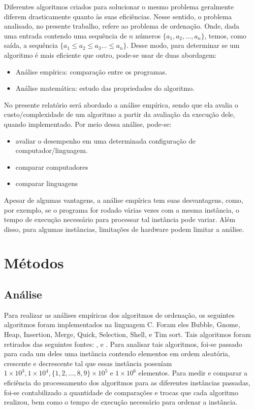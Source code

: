 \documentclass[report]{uftex}
\begin{document}
Diferentes algoritmos criados para solucionar o mesmo problema geralmente diferem drasticamente quanto às suas eficiências. Nesse sentido, o problema analisado, no presente trabalho, refere ao problema de ordenação. Onde, dada uma entrada contendo uma sequência de $n$ números $\{a_1,a_2,...,a_n\}$, temos, como saída, a sequência $\{a_1 \leq a_2 \leq a_3 ... \leq a_n\}$. Desse modo, para determinar se um algoritmo é mais eficiente que outro, pode-se usar de duas abordagem:
\begin{itemize}
    \item Análise empírica: comparação entre os programas.
    \item Análise matemática: estudo das propriedades do algoritmo.
\end{itemize}

No presente relatório será abordado a análise empírica, sendo que ela avalia o custo/complexidade de um algoritmo a partir da avaliação da execução dele, quando implementado. Por meio dessa análise, pode-se:
\begin{itemize}
    \item avaliar o desempenho em uma determinada configuração de computador/linguagem.
    \item comparar computadores
    \item comparar linguagens
\end{itemize}

Apesar de algumas vantagens, a análise empírica tem suas desvantagens, como, por exemplo, se o programa for rodado várias vezes com a mesma instância, o tempo de execução necessário para processar tal instância pode variar. Além disso, para algumas instâncias, limitações de hardware podem limitar a análise.


\chapter{Métodos}

\section{Análise}
Para realizar as análises empíricas dos algoritmos de ordenação, os seguintes algoritmos foram implementados na linguagem C. Foram eles Bubble, Gnome, Heap, Insertion, Merge, Quick, Selection, Shell, e Tim sort. Tais algoritmos foram retirados das seguintes fontes: \cite{cormen}, \cite{Backes} e \cite{geeks4geeks}. Para analisar tais algoritmos, foi-se passado para cada um deles uma instância contendo elementos em ordem aleatória, crescente e decrescente tal que essas instância possuíam $1\times10^{3}, 1\times10^{4}, \{1,2,...,8,9\}\times10^{5}$ e $1\times10^{6}$ elementos. Para medir e comparar a eficiência do processamento dos algoritmos para as diferentes instâncias passadas, foi-se contabilizado a quantidade de comparações e trocas que cada algoritmo realizou, bem como o tempo de execução necessário para ordenar a instância.\\
\end{document}
